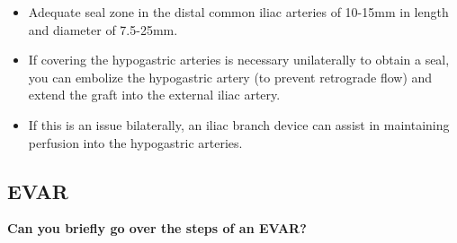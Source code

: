 \documentclass[
]{book}
\begin{document}
\begin{itemize}
\begin{itemize}
    \begin{itemize}
    \item
      Adequate seal zone in the distal common iliac arteries of
      10-15mm in length and diameter of 7.5-25mm.
    \item
      If covering the hypogastric arteries is necessary
      unilaterally to obtain a seal, you can embolize the
      hypogastric artery (to prevent retrograde flow) and extend
      the graft into the external iliac artery.
    \item
      If this is an issue bilaterally, an iliac branch device can
      assist in maintaining perfusion into the hypogastric
      arteries.
    \end{itemize}
  \end{itemize}
\end{itemize}

\hypertarget{evar}{%
\subsection{EVAR}\label{evar}}

\textbf{Can you briefly go over the steps of an EVAR?}
\citep{mooreVascularEndovascularSurgery2019}
\end{document}
